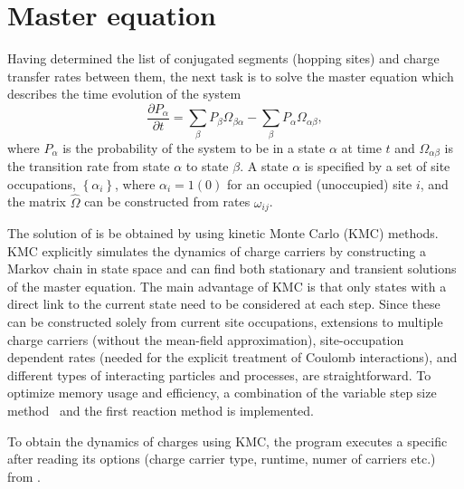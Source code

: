\section{Master equation}
\label{sec:kmc}
Having determined the list of conjugated segments (hopping sites) and charge transfer rates between them, the next task is to solve the master equation which describes the time evolution of the system
%
\begin{equation}
\label{equ:master}
\frac{\partial P_\alpha}{\partial t} = \sum_{\beta} P_\beta \Omega_{\beta \alpha} - 
\sum_{\beta} P_\alpha \Omega_{\alpha \beta},
\end{equation}
%
where $P_\alpha$ is the probability of the system to be in a state $\alpha$ at time $t$ and $\Omega_{\alpha \beta}$ is the transition rate from state $\alpha$ to state $\beta$. A state $\alpha$ is specified by a set of site occupations, $\left\{ \alpha_i \right\}$, where $\alpha_i = 1 (0)$ for an occupied (unoccupied) site $i$, and the matrix $\hat{\Omega}$ can be constructed from rates $\omega_{ij}$.

The solution of  is be obtained by using kinetic Monte Carlo (KMC) methods. KMC explicitly simulates the dynamics of charge carriers by constructing a Markov chain in state space and can find both stationary and transient solutions of the master equation. The main advantage of KMC is that only states with a direct link to the current state need to be considered at each step. Since these can be constructed solely from current site occupations, extensions to multiple charge carriers (without the mean-field approximation), site-occupation dependent rates (needed for the explicit treatment of Coulomb interactions), and different types of interacting particles and processes, are straightforward. To optimize memory usage and efficiency, a combination of the variable step size method~\cite{bortz_new_1975} and the first reaction method is implemented.

To obtain the dynamics of charges using KMC, the program \kmcrun executes a specific \calculator after reading its options (charge carrier type, runtime, numer of carriers etc.) from \xmloptions. 


